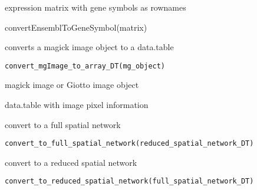 \documentclass[a4paper]{book}
\begin{document}
%
\begin{Value}
expression matrix with gene symbols as rownames
\end{Value}
%
\begin{Examples}
\begin{ExampleCode}
    convertEnsemblToGeneSymbol(matrix)
\end{ExampleCode}
\end{Examples}
%
\begin{Description}\relax
converts a magick image object to a data.table
\end{Description}
%
\begin{Usage}
\begin{verbatim}
convert_mgImage_to_array_DT(mg_object)
\end{verbatim}
\end{Usage}
%
\begin{Arguments}
\begin{ldescription}
\item[\code{mg\_object}] magick image or Giotto image object
\end{ldescription}
\end{Arguments}
%
\begin{Value}
data.table with image pixel information
\end{Value}
%
\begin{Description}\relax
convert to a full spatial network
\end{Description}
%
\begin{Usage}
\begin{verbatim}
convert_to_full_spatial_network(reduced_spatial_network_DT)
\end{verbatim}
\end{Usage}
%
\begin{Description}\relax
convert to a reduced spatial network
\end{Description}
%
\begin{Usage}
\begin{verbatim}
convert_to_reduced_spatial_network(full_spatial_network_DT)
\end{verbatim}
\end{Usage}
\end{document}
